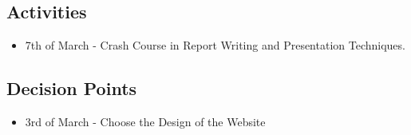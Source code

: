 \subsection{Activities}
\begin{itemize}
    \item 7th of March - Crash Course in Report Writing and Presentation Techniques.
\end{itemize}

\subsection{Decision Points}
\begin{itemize}
    \item 3rd of March - Choose the Design of the Website
\end{itemize}